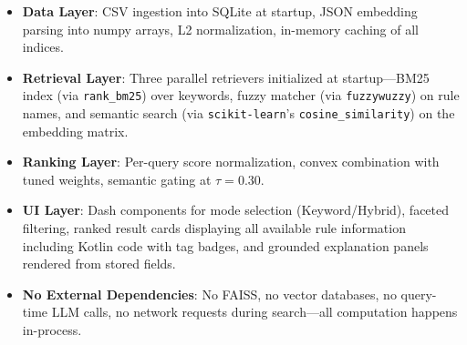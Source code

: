 \begin{itemize}[leftmargin=*,itemsep=2pt,topsep=2pt]
 \item \textbf{Data Layer}: CSV ingestion into SQLite at startup, JSON embedding parsing into numpy arrays, L2 normalization, in-memory caching of all indices.
 \item \textbf{Retrieval Layer}: Three parallel retrievers initialized at startup—BM25 index (via \texttt{rank\_bm25}) over keywords, fuzzy matcher (via \texttt{fuzzywuzzy}) on rule names, and semantic search (via \texttt{scikit-learn}'s \texttt{cosine\_similarity}) on the embedding matrix. 
 \item \textbf{Ranking Layer}: Per-query score normalization, convex combination with tuned weights, semantic gating at $\tau=0.30$.
 \item \textbf{UI Layer}: Dash components for mode selection (Keyword/Hybrid), faceted filtering, ranked result cards displaying all available rule information including Kotlin code with tag badges, and grounded explanation panels rendered from stored fields.
 \item \textbf{No External Dependencies}: No FAISS, no vector databases, no query-time LLM calls, no network requests during search—all computation happens in-process.
\end{itemize}

